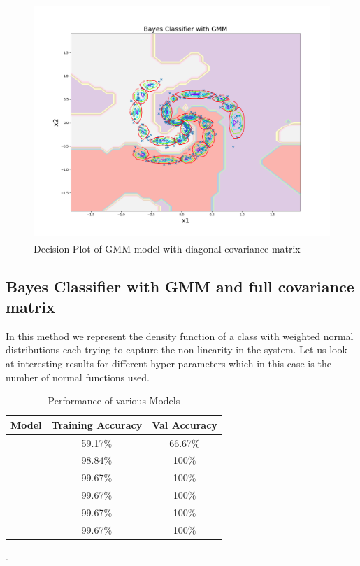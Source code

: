 \begin{figure}[!ht]
    \centering
    \includegraphics[height=3.5in]{Dataset_1b/GMM_7_decision_plot_diag.png}
    \caption{Decision Plot of GMM model with diagonal covariance matrix}
    \label{fig:20}
\end{figure}


\newpage
\subsection{Bayes Classifier with GMM and full covariance matrix}

In this method we represent the density function of a class with weighted normal distributions each trying to capture the non-linearity in the system. Let us look at interesting results for different hyper parameters which in this case is the number of normal functions used.


{
\begin{table}[!h]
\centering
\begin{tabular}{ |c|c|c|  }
\hline
\rowcolor{lightgray} Model & Training Accuracy & Val Accuracy \\
\hline
[1,1,1] & 59.17$\%$  & 66.67$\%$\\   
 \hline
[3,3,3] & 98.84$\%$  & 100$\%$ \\ 
\hline
[5,5,5] & 99.67$\%$  & 100$\%$\\ 
\hline
[7,7,7] & 99.67$\%$  & 100$\%$ \\ 
\hline
[10,10,10] & 99.67$\%$  & 100$\%$  \\ 
\hline
[15,15,15] & 99.67$\%$  & 100$\%$  \\ 
\hline
\end{tabular}
\caption{Performance of various Models}.
\label{table:5}
\end{table}
}

